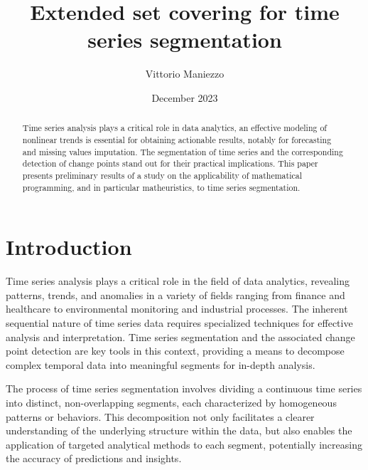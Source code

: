 \documentclass[runningheads]{llncs}
\begin{document}
\setlength{\abovedisplayskip}{3pt}
\setlength{\belowdisplayskip}{3pt}
\setlength{\belowcaptionskip}{-12pt}
   
\title{Extended set covering for time series segmentation}
\author{Vittorio Maniezzo  }
\date{December 2023}
\maketitle

\vspace{-0.5cm}
\begin{abstract}
Time series analysis plays a critical role in data analytics, an effective modeling of nonlinear trends is essential for obtaining actionable results, notably for forecasting and missing values imputation. The segmentation of time series and the corresponding detection of change points stand out for their practical implications. This paper presents preliminary results of a study on the applicability of mathematical programming, and in particular matheuristics, to time series segmentation.
\end{abstract}
\vspace{-0.5cm}

\section{Introduction} \label{sec:intro}

Time series analysis plays a critical role in the field of data analytics, revealing patterns, trends, and anomalies in a variety of fields ranging from finance and healthcare to environmental monitoring and industrial processes. The inherent sequential nature of time series data requires specialized techniques for effective analysis and interpretation. Time series segmentation and the associated change point detection are key tools in this context, providing a means to decompose complex temporal data into meaningful segments for in-depth analysis.

The process of time series segmentation \cite{LMS14} 
involves dividing a continuous time series into distinct, non-overlapping segments, each characterized by homogeneous patterns or behaviors. This decomposition not only facilitates a clearer understanding of the underlying structure within the data, but also enables the application of targeted analytical methods to each segment, potentially increasing the accuracy of predictions and insights.
\end{document}
